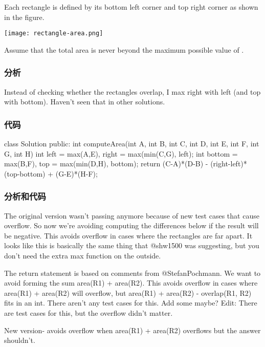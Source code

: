 Each rectangle is defined by its bottom left corner and top right corner as shown in the figure.

\begin{center}
    \texttt{[image: rectangle-area.png]}\\
    \label{fig:rectangle-area}
\end{center}

Assume that the total area is never beyond the maximum possible value of .

\subsubsection{分析}
Instead of checking whether the rectangles overlap, I max right with left (and top with bottom). Haven't seen that in other solutions.

\subsubsection{代码}
\begin{Code}
class Solution {
    public:
    int computeArea(int A, int B, int C, int D, int E, int F, int G, int H) {
        int left = max(A,E), right = max(min(C,G), left);
        int bottom = max(B,F), top = max(min(D,H), bottom);
        return (C-A)*(D-B) - (right-left)*(top-bottom) + (G-E)*(H-F);
    }
}
\end{Code}

\subsubsection{分析和代码}
The original version wasn't passing anymore because of new test cases that cause overflow. So now we're avoiding computing the differences below if the result will be negative. This avoids overflow in cases where the rectangles are far apart. It looks like this is basically the same thing that @shw1500 was suggesting, but you don't need the extra max function on the outside.

The return statement is based on comments from @StefanPochmann. We want to avoid forming the sum area(R1) + area(R2). This avoids overflow in cases where area(R1) + area(R2) will overflow, but area(R1) + area(R2) - overlap(R1, R2) fits in an int. There aren't any test cases for this. Add some maybe? Edit: There are test cases for this, but the overflow didn't matter.

New version- avoids overflow when area(R1) + area(R2) overflows but the answer shouldn't.

